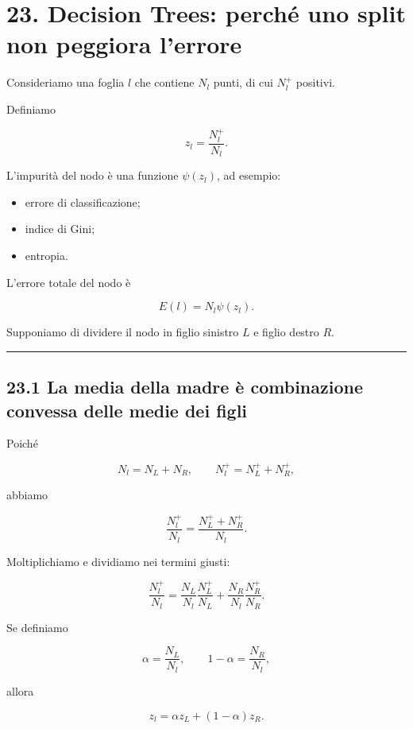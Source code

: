 \documentclass{article}
\providecommand{\tightlist}{%
  \setlength{\itemsep}{0pt}\setlength{\parskip}{0pt}}
\begin{document}
\section{23. Decision Trees: perché uno split non peggiora
l'errore}\label{decision-trees-perchuxe9-uno-split-non-peggiora-lerrore}

Consideriamo una foglia \(l\) che contiene \(N_l\) punti, di cui
\(N_l^+\) positivi.

Definiamo

\[
z_l = \frac{N_l^+}{N_l}.
\]

L'impurità del nodo è una funzione \(\psi(z_l)\), ad esempio:

\begin{itemize}
\tightlist
\item
  errore di classificazione;
\item
  indice di Gini;
\item
  entropia.
\end{itemize}

L'errore totale del nodo è

\[
E(l)=N_l\psi(z_l).
\]

Supponiamo di dividere il nodo in figlio sinistro \(L\) e figlio destro
\(R\).

\begin{center}\rule{0.5\linewidth}{0.5pt}\end{center}

\subsection{23.1 La media della madre è combinazione convessa delle
medie dei
figli}\label{la-media-della-madre-uxe8-combinazione-convessa-delle-medie-dei-figli}

Poiché

\[
N_l=N_L+N_R,
\qquad
N_l^+=N_L^+ + N_R^+,
\]

abbiamo

\[
\frac{N_l^+}{N_l}
=
\frac{N_L^+ + N_R^+}{N_l}.
\]

Moltiplichiamo e dividiamo nei termini giusti:

\[
\frac{N_l^+}{N_l}
=
\frac{N_L}{N_l}\frac{N_L^+}{N_L}
+
\frac{N_R}{N_l}\frac{N_R^+}{N_R}.
\]

Se definiamo

\[
\alpha=\frac{N_L}{N_l},
\qquad
1-\alpha=\frac{N_R}{N_l},
\]

allora

\[
z_l = \alpha z_L + (1-\alpha)z_R.
\]
\end{document}
